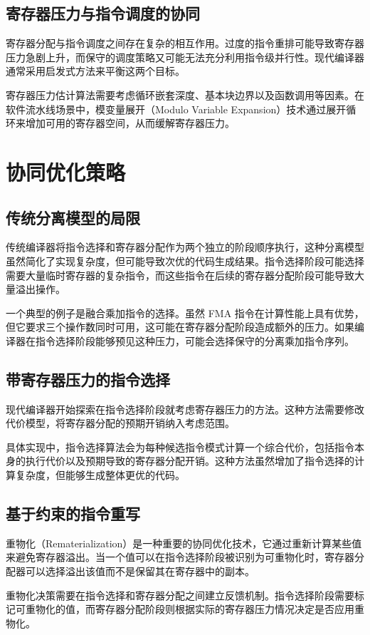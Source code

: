 \section{寄存器压力与指令调度的协同}
寄存器分配与指令调度之间存在复杂的相互作用。过度的指令重排可能导致寄存器压力急剧上升，而保守的调度策略又可能无法充分利用指令级并行性。现代编译器通常采用启发式方法来平衡这两个目标。\par
寄存器压力估计算法需要考虑循环嵌套深度、基本块边界以及函数调用等因素。在软件流水线场景中，模变量展开（Modulo Variable Expansion）技术通过展开循环来增加可用的寄存器空间，从而缓解寄存器压力。\par
\chapter{协同优化策略}
\section{传统分离模型的局限}
传统编译器将指令选择和寄存器分配作为两个独立的阶段顺序执行，这种分离模型虽然简化了实现复杂度，但可能导致次优的代码生成结果。指令选择阶段可能选择需要大量临时寄存器的复杂指令，而这些指令在后续的寄存器分配阶段可能导致大量溢出操作。\par
一个典型的例子是融合乘加指令的选择。虽然 FMA 指令在计算性能上具有优势，但它要求三个操作数同时可用，这可能在寄存器分配阶段造成额外的压力。如果编译器在指令选择阶段能够预见这种压力，可能会选择保守的分离乘加指令序列。\par
\section{带寄存器压力的指令选择}
现代编译器开始探索在指令选择阶段就考虑寄存器压力的方法。这种方法需要修改代价模型，将寄存器分配的预期开销纳入考虑范围。\par
具体实现中，指令选择算法会为每种候选指令模式计算一个综合代价，包括指令本身的执行代价以及预期导致的寄存器分配开销。这种方法虽然增加了指令选择的计算复杂度，但能够生成整体更优的代码。\par
\section{基于约束的指令重写}
重物化（Rematerialization）是一种重要的协同优化技术，它通过重新计算某些值来避免寄存器溢出。当一个值可以在指令选择阶段被识别为可重物化时，寄存器分配器可以选择溢出该值而不是保留其在寄存器中的副本。\par
重物化决策需要在指令选择和寄存器分配之间建立反馈机制。指令选择阶段需要标记可重物化的值，而寄存器分配阶段则根据实际的寄存器压力情况决定是否应用重物化。\par
